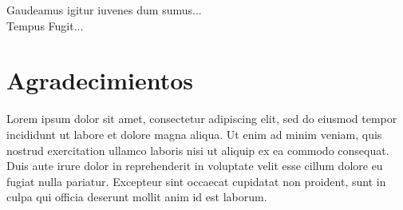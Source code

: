 \vspace*{\fill}

\begin{flushright}
    {\large Gaudeamus igitur iuvenes dum sumus...}\\
    {\large Tempus Fugit...}\\
\end{flushright}
\vspace*{\fill}


\newpage
\chapter{Agradecimientos}

Lorem ipsum dolor sit amet, consectetur adipiscing elit, sed do eiusmod tempor incididunt ut labore et dolore magna aliqua. Ut enim ad minim veniam, quis nostrud exercitation ullamco laboris nisi ut aliquip ex ea commodo consequat. Duis aute irure dolor in reprehenderit in voluptate velit esse cillum dolore eu fugiat nulla pariatur. Excepteur sint occaecat cupidatat non proident, sunt in culpa qui officia deserunt mollit anim id est laborum.
